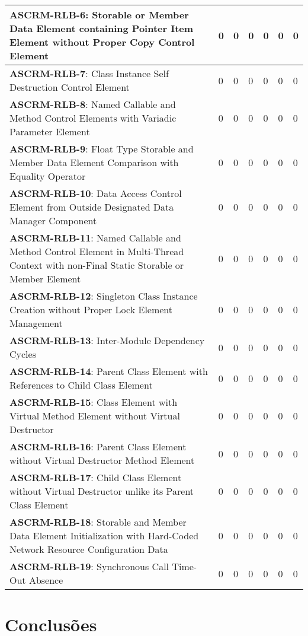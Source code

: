 \documentclass[openany,10pt,a4paper]{article}
\begin{document}
\begin{longtable}
\begin{table}[h]
\begin{tabular}{|p{3in}|p{0.3in}|p{0.3in}|p{0.3in}|p{0.3in}|p{0.3in}|p{0.4in}|}
\textbf{ASCRM-RLB-6}: Storable or Member Data Element containing Pointer Item Element without Proper Copy Control Element & 0 & 0 & 0 & 0 & 0 & 0 \\ \hline
\textbf{ASCRM-RLB-7}: Class Instance Self Destruction Control Element & 0 & 0 & 0 & 0 & 0 & 0 \\ \hline
\textbf{ASCRM-RLB-8}: Named Callable and Method Control Elements with Variadic Parameter Element & 0 & 0 & 0 & 0 & 0 & 0 \\ \hline
\textbf{ASCRM-RLB-9}: Float Type Storable and Member Data Element Comparison with Equality Operator & 0 & 0 & 0 & 0 & 0 & 0 \\ \hline
\textbf{ASCRM-RLB-10}: Data Access Control Element from Outside Designated Data Manager Component & 0 & 0 & 0 & 0 & 0 & 0 \\ \hline
\textbf{ASCRM-RLB-11}: Named Callable and Method Control Element in Multi-Thread Context with non-Final Static Storable or Member Element & 0 & 0 & 0 & 0 & 0 & 0 \\ \hline
\textbf{ASCRM-RLB-12}: Singleton Class Instance Creation without Proper Lock Element Management & 0 & 0 & 0 & 0 & 0 & 0 \\ \hline
\textbf{ASCRM-RLB-13}: Inter-Module Dependency Cycles & 0 & 0 & 0 & 0 & 0 & 0 \\ \hline
\textbf{ASCRM-RLB-14}: Parent Class Element with References to Child Class Element & 0 & 0 & 0 & 0 & 0 & 0 \\ \hline
\textbf{ASCRM-RLB-15}: Class Element with Virtual Method Element without Virtual Destructor & 0 & 0 & 0 & 0 & 0 & 0 \\ \hline
\textbf{ASCRM-RLB-16}: Parent Class Element without Virtual Destructor Method Element & 0 & 0 & 0 & 0 & 0 & 0 \\ \hline
\textbf{ASCRM-RLB-17}: Child Class Element without Virtual Destructor unlike its Parent Class Element & 0 & 0 & 0 & 0 & 0 & 0 \\ \hline
\textbf{ASCRM-RLB-18}: Storable and Member Data Element Initialization with Hard-Coded Network Resource Configuration Data & 0 & 0 & 0 & 0 & 0 & 0 \\ \hline
\textbf{ASCRM-RLB-19}: Synchronous Call Time-Out Absence & 0 & 0 & 0 & 0 & 0 & 0 \\ \hline
	\end{tabular} 
	\label{tab:tabela1}
\end{table}

\section{Conclusões}



\end{longtable}
\end{document}
